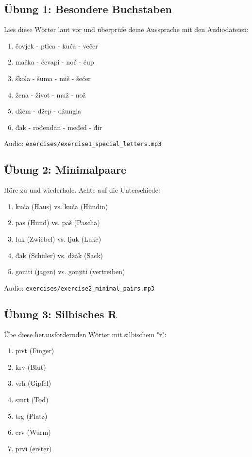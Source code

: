 \subsection{Übung 1: Besondere Buchstaben}

Lies diese Wörter laut vor und überprüfe deine Aussprache mit den Audiodateien:

\begin{enumerate}
    \item čovjek - ptica - kuća - večer
    \item mačka - ćevapi - noć - ćup
    \item škola - šuma - miš - šećer
    \item žena - život - muž - nož
    \item džem - džep - džungla
    \item đak - rođendan - međed - đir
\end{enumerate}

Audio: \small\texttt{exercises/exercise1\_special\_letters.mp3}

\subsection{Übung 2: Minimalpaare}

Höre zu und wiederhole. Achte auf die Unterschiede:

\begin{enumerate}
    \item kuća (Haus) vs. kuča (Hündin)
    \item pas (Hund) vs. paš (Pascha)
    \item luk (Zwiebel) vs. ljuk (Luke)
    \item đak (Schüler) vs. džak (Sack)
    \item goniti (jagen) vs. gonjiti (vertreiben)
\end{enumerate}

Audio: \small\texttt{exercises/exercise2\_minimal\_pairs.mp3}

\subsection{Übung 3: Silbisches R}

Übe diese herausfordernden Wörter mit silbischem "r":

\begin{enumerate}
    \item prst (Finger)
    \item krv (Blut)
    \item vrh (Gipfel)
    \item smrt (Tod)
    \item trg (Platz)
    \item crv (Wurm)
    \item prvi (erster)
\end{enumerate}

